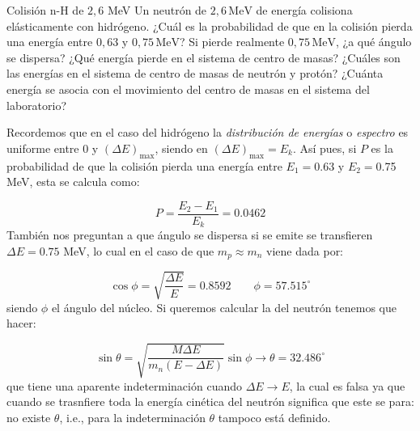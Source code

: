 \begingroup
\makeatletter
\let\old@floatboxreset\@floatboxreset
\def\@floatboxreset{\old@floatboxreset\centering} %
\makeatother

\endgroup



\begin{Ejercicio}{Colisión n-H de $2{,}6$ MeV}\label{Ej:04-03}
Un neutrón de $2{,}6\,\mathrm{MeV}$ de energía colisiona elásticamente con hidrógeno. 
¿Cuál es la probabilidad de que en la colisión pierda una energía entre $0{,}63$ y $0{,}75\,\mathrm{MeV}$? 
Si pierde realmente $0{,}75\,\mathrm{MeV}$, ¿a qué ángulo se dispersa? 
¿Qué energía pierde en el sistema de centro de masas? 
¿Cuáles son las energías en el sistema de centro de masas de neutrón y protón? 
¿Cuánta energía se asocia con el movimiento del centro de masas en el sistema del laboratorio?
\end{Ejercicio}


Recordemos que en el caso del hidrógeno la \textit{distribución de energías} o \textit{espectro} es uniforme entre 0 y $(\Delta E)_{\max}$, siendo en $(\Delta E)_{\max} = E_k$. Así pues, si $P$ es la probabilidad de que la colisión pierda una energía entre $E_1=$0.63 y $E_2=$0.75 MeV, esta se calcula como: 

\begin{equation}
    P = \frac{E_2-E_1}{E_k} = 0.0462
\end{equation}
También nos preguntan a que ángulo se dispersa si se emite se transfieren $\Delta E=0.75$ MeV, lo cual en el caso de que $m_p\approx m_n$ viene dada por: 

\begin{equation}
    \cos \phi = \sqrt{\frac{\Delta E}{E}}  = 0.8592\qquad \phi = 57.515^\circ
\end{equation}
siendo $\phi$ el ángulo del núcleo. Si queremos calcular la del neutrón tenemos que hacer: 

\begin{equation}
    \sin \theta = \sqrt{\frac{M\Delta E}{m_n(E-\Delta E)}} \sin \phi \to \theta = 32.486^\circ
\end{equation}
que tiene una aparente indeterminación cuando $\Delta E \to E$, la cual es falsa ya que cuando se trasnfiere toda la energía cinética del neutrón significa que este se para: no existe $\theta$, i.e., para la indeterminación $\theta$ tampoco está definido.

